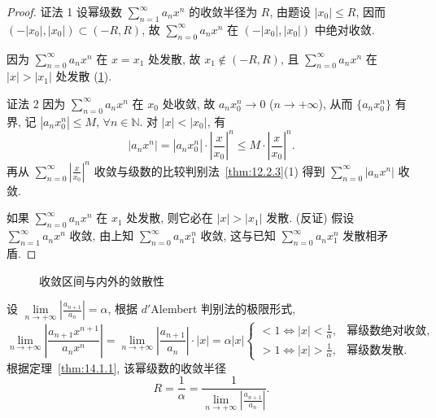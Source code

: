 \begin{proof}
证法 1 设幂级数 $\sum_{n=1}^{\infty}a_{n}x^{n}$ 的收敛半径为 $R$, 由题设 $|x_{0}|\leqslant R$, 因而 $(-|x_{0}|,|x_{0}|)\subset(-R,R)$, 故 $\sum_{n=0}^{\infty}a_{n}x^{n}$ 在 $(-|x_{0}|,|x_{0}|)$ 中绝对收敛.

因为 $\sum_{n=0}^{\infty}a_{n}x^{n}$ 在 $x=x_{1}$ 处发散, 故 $x_{1}\notin(-R,R)$, 且 $\sum_{n=0}^{\infty}a_{n}x^{n}$ 在 $|x|>|x_{1}|$ 处发散 (\cref{fig:14.1.1}).

证法 2 因为 $\sum_{n=0}^{\infty}a_{n}x^{n}$ 在 $x_{0}$ 处收敛, 故 $a_{n}x_{0}^{n}\to0$ ($n\to+\infty$), 从而 $\{a_{n}x_{0}^{n}\}$ 有界, 记 $|a_{n}x_{0}^{n}|\leqslant M$, $\forall n\in\mathbb{N}$. 对 $|x|<|x_{0}|$, 有
\[
  |a_{n}x^{n}|=|a_{n}x_{0}^{n}|\cdot\left|\frac{x}{x_{0}}\right|^{n}\leqslant M\cdot\left|\frac{x}{x_{0}}\right|^{n}.
\]
再从 $\sum_{n=0}^{\infty}\left|\frac{x}{x_{0}}\right|^{n}$ 收敛与级数的比较判别法~\ref{thm:12.2.3}(1) 得到 $\sum_{n=0}^{\infty}|a_{n}x^{n}|$ 收敛.

如果 $\sum_{n=0}^{\infty}a_{n}x^{n}$ 在 $x_{1}$ 处发散, 则它必在 $|x|>|x_{1}|$ 发散. (反证) 假设 $\sum_{n=1}^{\infty}a_{n}x^{n}$ 收敛, 由上知 $\sum_{n=0}^{\infty}a_{n}x_{1}^{n}$ 收敛, 这与已知 $\sum_{n=0}^{\infty}a_{n}x_{1}^{n}$ 发散相矛盾.
\end{proof}

\begin{figure}[htbp]
  \centering
  \caption{收敛区间与内外的敛散性}\label{fig:14.1.1}
\end{figure}

\begin{remark}\label{rem:14.1.1}
设 $\lim\limits_{n\to+\infty}\left|\frac{a_{n+1}}{a_{n}}\right|=\alpha$, 根据 $d'$Alembert 判别法的极限形式,
\[
  \lim_{n\to+\infty}\left|\frac{a_{n+1}x^{n+1}}{a_{n}x^{n}}\right|=\lim_{n\to+\infty}\left|\frac{a_{n+1}}{a_{n}}\right|\cdot|x|=\alpha|x|\begin{cases}
    <1\Leftrightarrow|x|<\frac{1}{\alpha}, & \text{幂级数绝对收敛},\\
    >1\Leftrightarrow|x|>\frac{1}{\alpha}, & \text{幂级数发散}.
\end{cases}
\]
根据定理~\ref{thm:14.1.1}, 该幂级数的收敛半径
\[
  R=\frac{1}{\alpha}=\frac{1}{\lim\limits_{n\to+\infty}\left|\frac{a_{n+1}}{a_{n}}\right|}.
\]
\end{remark}

